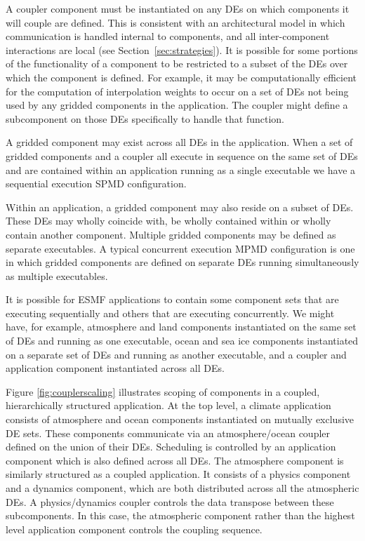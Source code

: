 A coupler component must be instantiated on any DEs on which components
it will couple are defined.  This is consistent with an architectural
model in which communication is handled internal to components, and all
inter-component interactions are local (see Section~\ref{sec:strategies}).  
It is possible for
some portions of the functionality of a component to be restricted to
a subset of the DEs over which the component is defined.  For example, 
it may be computationally efficient for the computation of interpolation
weights to occur on a set of DEs not being used by any gridded components
in the application.  The coupler might define a subcomponent on those DEs 
specifically to handle that function.

A gridded component may exist across all DEs in the application.  When 
a set of gridded  components and a coupler all execute in sequence on 
the same set of DEs and are contained within an application running 
as a single executable we have a sequential execution SPMD configuration.  

Within an application, a gridded component may also reside on 
a subset of DEs.  These DEs may wholly coincide with, be wholly 
contained within or wholly contain another component.  Multiple gridded 
components may be defined as separate executables.  A typical 
concurrent execution MPMD configuration is one in which gridded components 
are defined on separate DEs running simultaneously as multiple 
executables.  

It is possible for ESMF applications to contain some component sets
that are executing sequentially and others that are executing concurrently.
We might have, for example, atmosphere and land components instantiated 
on the same set of 
DEs and running as one executable, ocean and sea ice 
components instantiated on a separate set of DEs and running as 
another executable, and a coupler and application component 
instantiated across all DEs.

Figure \ref{fig:couplerscaling} illustrates scoping of components
in a coupled, hierarchically structured application.  At the top level, 
a climate application consists of atmosphere and ocean components 
instantiated on mutually exclusive DE sets.  These components communicate 
via an atmosphere/ocean coupler defined on the union of their DEs.  
Scheduling is controlled by an application
component which is also defined across all DEs.  The atmosphere component
is similarly structured as a coupled application.  It consists of a 
physics component and a dynamics component, which are both distributed
across all the atmospheric DEs.  A physics/dynamics coupler controls
the data transpose between these subcomponents.  In this case, the
atmospheric component rather than the highest level application component
controls the coupling sequence.  

